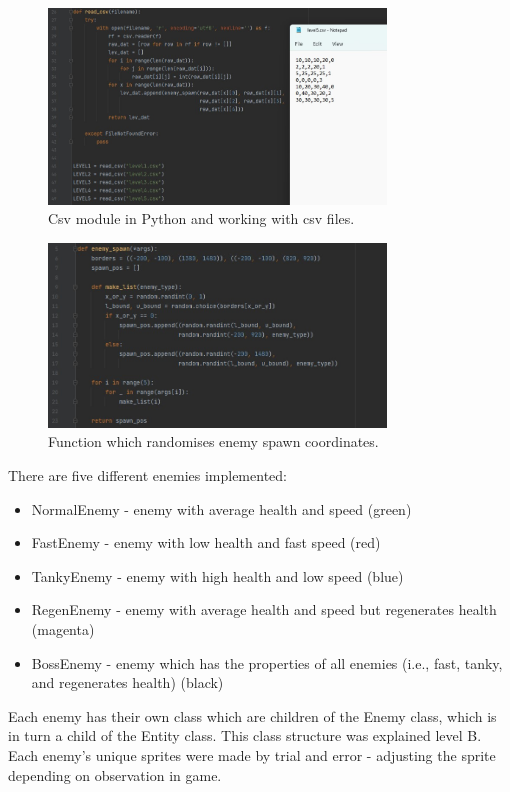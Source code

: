 \documentclass[a4paper, 11pt]{report}
\begin{document}
\begin{figure}[h]
    \centering
    \includegraphics[width=0.8\textwidth]{csv}
    \caption{Csv module in Python and working with csv files.}
\end{figure}
\begin{figure}[h]
    \centering
    \includegraphics[width=0.8\textwidth]{random_spawn}
    \caption{Function which randomises enemy spawn coordinates.}
\end{figure}
There are five different enemies implemented:
\begin{itemize}
  \item NormalEnemy - enemy with average health and speed (green)
  \item FastEnemy - enemy with low health and fast speed (red)
  \item TankyEnemy - enemy with high health and low speed (blue)
  \item RegenEnemy - enemy with average health and speed but regenerates health (magenta)
  \item BossEnemy - enemy which has the properties of all enemies (i.e., fast, tanky, and regenerates health) (black)
\end{itemize}

Each enemy has their own class which are children of the Enemy class, which is in turn a child of the Entity class. This class structure was explained level B. Each enemy's unique sprites were made by trial and error - adjusting the sprite depending on observation in game.
\end{document}
